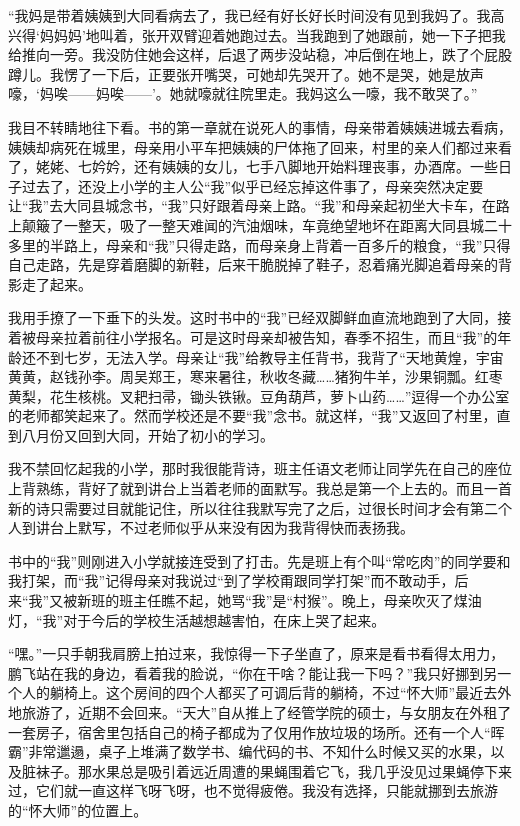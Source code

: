 \documentclass[openany,scheme = chinese, linespread = 1.5]{ctexbook}
\begin{document}
“我妈是带着姨姨到大同看病去了，我已经有好长好长时间没有见到我妈了。我高兴得‘妈妈妈’地叫着，张开双臂迎着她跑过去。当我跑到了她跟前，她一下子把我给推向一旁。我没防住她会这样，后退了两步没站稳，冲后倒在地上，跌了个屁股蹲儿。我愣了一下后，正要张开嘴哭，可她却先哭开了。她不是哭，她是放声嚎，‘妈唉——妈唉——’。她就嚎就往院里走。我妈这么一嚎，我不敢哭了。”

我目不转睛地往下看。书的第一章就在说死人的事情，母亲带着姨姨进城去看病，姨姨却病死在城里，母亲用小平车把姨姨的尸体拖了回来，村里的亲人们都过来看了，姥姥、七妗妗，还有姨姨的女儿，七手八脚地开始料理丧事，办酒席。一些日子过去了，还没上小学的主人公“我”似乎已经忘掉这件事了，母亲突然决定要让“我”去大同县城念书，“我”只好跟着母亲上路。“我”和母亲起初坐大卡车，在路上颠簸了一整天，吸了一整天难闻的汽油烟味，车竟绝望地坏在距离大同县城二十多里的半路上，母亲和“我”只得走路，而母亲身上背着一百多斤的粮食，“我”只得自己走路，先是穿着磨脚的新鞋，后来干脆脱掉了鞋子，忍着痛光脚追着母亲的背影走了起来。

我用手撩了一下垂下的头发。这时书中的“我”已经双脚鲜血直流地跑到了大同，接着被母亲拉着前往小学报名。可是这时母亲却被告知，春季不招生，而且“我”的年龄还不到七岁，无法入学。母亲让“我”给教导主任背书，我背了“天地黄煌，宇宙黄黄，赵钱孙李。周吴郑王，寒来暑往，秋收冬藏……猪狗牛羊，沙果铜瓢。红枣黄梨，花生核桃。叉耙扫帚，锄头铁锹。豆角葫芦，萝卜山药……”逗得一个办公室的老师都笑起来了。然而学校还是不要“我”念书。就这样，“我”又返回了村里，直到八月份又回到大同，开始了初小的学习。

我不禁回忆起我的小学，那时我很能背诗，班主任语文老师让同学先在自己的座位上背熟练，背好了就到讲台上当着老师的面默写。我总是第一个上去的。而且一首新的诗只需要过目就能记住，所以往往我默写完了之后，过很长时间才会有第二个人到讲台上默写，不过老师似乎从来没有因为我背得快而表扬我。

书中的“我”则刚进入小学就接连受到了打击。先是班上有个叫“常吃肉”的同学要和我打架，而“我”记得母亲对我说过“到了学校甭跟同学打架”而不敢动手，后来“我”又被新班的班主任瞧不起，她骂“我”是“村猴”。晚上，母亲吹灭了煤油灯，“我”对于今后的学校生活越想越害怕，在床上哭了起来。

“嘿。”一只手朝我肩膀上拍过来，我惊得一下子坐直了，原来是看书看得太用力，鹏飞站在我的身边，看着我的脸说，“你在干啥？能让我一下吗？”我只好挪到另一个人的躺椅上。这个房间的四个人都买了可调后背的躺椅，不过“怀大师”最近去外地旅游了，近期不会回来。“天大”自从推上了经管学院的硕士，与女朋友在外租了一套房子，宿舍里包括自己的椅子都成为了仅用作放垃圾的场所。还有一个人“晖霸”非常邋遢，桌子上堆满了数学书、编代码的书、不知什么时候又买的水果，以及脏袜子。那水果总是吸引着远近周遭的果蝇围着它飞，我几乎没见过果蝇停下来过，它们就一直这样飞呀飞呀，也不觉得疲倦。我没有选择，只能就挪到去旅游的“怀大师”的位置上。
\end{document}

